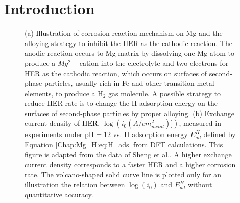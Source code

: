 \section{Introduction}

\begingroup
\begin{figure}[!ht]
  \centering
  \label{Chap:Mg_H:fig:1a}
  \label{Chap:Mg_H:fig:1b}
\caption[Illustration of corrosion reaction mechanism on Mg and the alloying strategy to inhibit \ac{HER}]{(a) Illustration of corrosion reaction mechanism on Mg and the alloying strategy to inhibit the \ac{HER} as the cathodic reaction. The anodic reaction occurs to Mg matrix by dissolving one Mg atom to produce a $Mg^{2+}$ cation into the electrolyte and two electrons for HER as the cathodic reaction, which occurs on surfaces of second-phase particles, usually rich in Fe and other transition metal elements, to produce a $\text{H}_\text{2}$ gas molecule. A possible strategy to reduce \ac{HER} rate is to change the H adsorption energy on the surfaces of second-phase particles by proper alloying. (b) Exchange current density of \ac{HER}, $\log(i_0(A/cm^2_{metal})])$, measured in experiments under pH$=$12 vs. H adsorption energy $E_{ad}^H$ defined by Equation \ref{Chap:Mg_H:eq:H_ads} from \ac{DFT} calculations. This figure is adapted from the data of Sheng et al.\cite{sheng2013correlating}. A higher exchange current density corresponds to a faster \ac{HER} and a higher corrosion rate. The volcano-shaped solid curve line is plotted only for an illustration the relation between $\log(i_0)$ and $E_{ad}^H$ without quantitative accuracy.}
  \label{Chap:Mg_H:fig1}
\end{figure}
\endgroup

